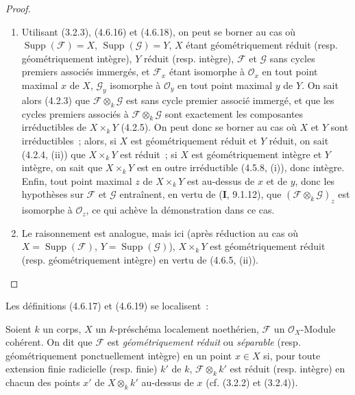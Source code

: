 \begin{proof}
\begin{enumerate}
\item[(i)] Utilisant (3.2.3), (4.6.16) et (4.6.18), on peut se borner au cas où
$\operatorname{Supp}(\mathscr F)=X$, $\operatorname{Supp}(\mathscr G)=Y$, $X$
étant géométriquement réduit (resp. géométriquement intègre), $Y$ réduit
(resp. intègre), $\mathscr F$ et $\mathscr G$ sans cycles premiers associés
immergés, et $\mathscr F_x$ étant isomorphe à $\mathcal O_x$ en tout point
maximal $x$ de $X$, $\mathscr G_y$ isomorphe à $\mathcal O_y$ en tout point
maximal $y$ de $Y$. On sait alors (4.2.3) que
$\mathscr F\otimes_k\mathscr G$ est sans cycle premier associé immergé, et que
les cycles premiers associés à $\mathscr F\otimes_k\mathscr G$ sont exactement
les composantes irréductibles de $X\times_k Y$ (4.2.5). On peut donc se borner
au cas où $X$ et $Y$ sont irréductibles~; alors, si $X$ est géométriquement
réduit et $Y$ réduit, on sait (4.2.4, (ii)) que $X\times_k Y$ est réduit~; si
$X$ est géométriquement intègre et $Y$ intègre, on sait que $X\times_k Y$ est
en outre irréductible (4.5.8, (i)), donc intègre. Enfin, tout point maximal $z$
de $X\times_k Y$ est au-dessus de $x$ et de $y$, donc les hypothèses sur
$\mathscr F$ et $\mathscr G$ entraînent, en vertu de (\textbf{I}, 9.1.12), que
$(\mathscr F\otimes_k\mathscr G)_z$ est isomorphe à $\mathcal O_z$, ce qui
achève la démonstration dans ce cas.

\item[(ii)] Le raisonnement est analogue, mais ici (après réduction au cas où
$X=\operatorname{Supp}(\mathscr F)$, $Y=\operatorname{Supp}(\mathscr G)$),
$X\times_k Y$ est géométriquement réduit (resp. géométriquement intègre) en
vertu de (4.6.5, (ii)).
\end{enumerate}
\end{proof}

Les définitions (4.6.17) et (4.6.19) se localisent~:

\begin{definition}[4.6.22]
\label{IV.2.4.6.22-fr}
Soient $k$ un corps, $X$ un $k$-préschéma localement noethérien, $\mathscr F$
un $\mathcal O_X$-Module cohérent. On dit que $\mathscr F$ est
\emph{géométriquement réduit} ou \emph{séparable} \textup{(resp. géométriquement
ponctuellement intègre)} en un point $x\in X$ si, pour toute extension finie
radicielle \textup{(resp.} finie) $k'$ de $k$, $\mathscr F\otimes_k k'$ est réduit
\textup{(resp.} intègre) en chacun des points $x'$ de $X\otimes_k k'$ au-dessus de $x$
\textup{(cf. (3.2.2) et (3.2.4))}.
\end{definition}

